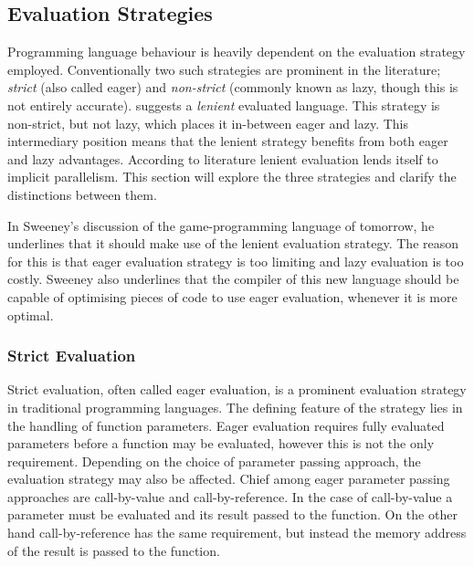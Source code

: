\subsection{Evaluation Strategies}
Programming language behaviour is heavily dependent on the evaluation strategy employed. Conventionally two such strategies are prominent in the literature\cite{DBLP:journals/cl/Tremblay-lenient}; \textit{strict} (also called eager) and \textit{non-strict} (commonly known as lazy, though this is not entirely accurate). \cite{DBLP:journals/cl/Tremblay-lenient} suggests a \textit{lenient} evaluated language. This strategy is non-strict, but not lazy, which places it in-between eager and lazy\cite{DBLP:journals/cl/Tremblay-lenient}. This intermediary position means that the lenient strategy benefits from both eager and lazy advantages. According to literature lenient evaluation lends itself to implicit parallelism\cite{DBLP:journals/cl/Tremblay-parallel}. This section will explore the three strategies and clarify the distinctions between them.

In Sweeney's discussion of the game-programming language of tomorrow, he underlines that it should make use of the lenient evaluation strategy\cite{theNextMainstreanProgrammingLanguage}. The reason for this is that eager evaluation strategy is too limiting and lazy evaluation is too costly. Sweeney also underlines that the compiler of this new language should be capable of optimising pieces of code to use eager evaluation, whenever it is more optimal.

\subsubsection{Strict Evaluation}
Strict evaluation, often called eager evaluation, is a prominent evaluation strategy in traditional programming languages. The defining feature of the strategy lies in the handling of function parameters. Eager evaluation requires fully evaluated parameters before a function may be evaluated\cite[p.~103]{huttel2010transitions}, however this is not the only requirement. Depending on the choice of parameter passing approach, the evaluation strategy may also be affected. Chief among eager parameter passing approaches are call-by-value and call-by-reference. In the case of call-by-value a parameter must be evaluated and its result passed to the function. On the other hand call-by-reference has the same requirement, but instead the memory address of the result is passed to the function.

